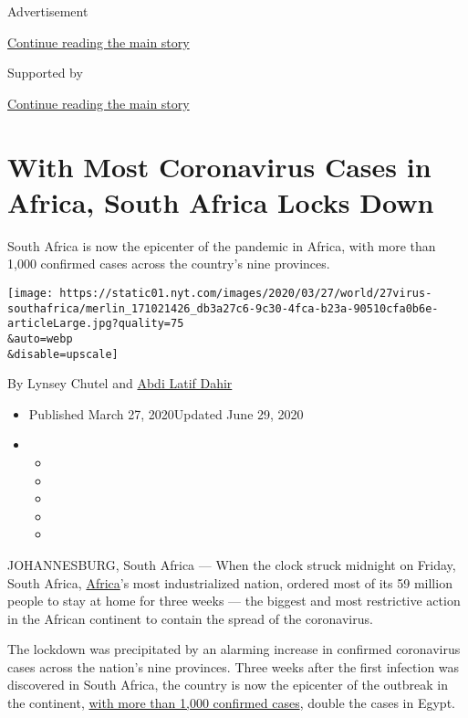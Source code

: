 Advertisement

\protect\hyperlink{after-top}{Continue reading the main story}

Supported by

\protect\hyperlink{after-sponsor}{Continue reading the main story}

\hypertarget{with-most-coronavirus-cases-in-africa-south-africa-locks-down}{%
\section{With Most Coronavirus Cases in Africa, South Africa Locks
Down}\label{with-most-coronavirus-cases-in-africa-south-africa-locks-down}}

South Africa is now the epicenter of the pandemic in Africa, with more
than 1,000 confirmed cases across the country's nine provinces.

\texttt{[image: https://static01.nyt.com/images/2020/03/27/world/27virus-southafrica/merlin\_171021426\_db3a27c6-9c30-4fca-b23a-90510cfa0b6e-articleLarge.jpg?quality=75\\\&auto=webp\\\&disable=upscale]}

By Lynsey Chutel and
\href{https://www.nytimes.com/by/abdi-latif-dahir}{Abdi Latif Dahir}

\begin{itemize}
\item
  Published March 27, 2020Updated June 29, 2020
\item
  \begin{itemize}
  \item
  \item
  \item
  \item
  \item
  \end{itemize}
\end{itemize}

JOHANNESBURG, South Africa --- When the clock struck midnight on Friday,
South Africa,
\href{https://www.nytimes.com/2020/06/29/world/africa/Africa-middle-class-coronavirus.html}{Africa}'s
most industrialized nation, ordered most of its 59 million people to
stay at home for three weeks --- the biggest and most restrictive action
in the African continent to contain the spread of the coronavirus.

The lockdown was precipitated by an alarming increase in confirmed
coronavirus cases across the nation's nine provinces. Three weeks after
the first infection was discovered in South Africa, the country is now
the epicenter of the outbreak in the continent,
\href{https://twitter.com/nicd_sa/status/1243438789692919808}{with more
than 1,000 confirmed cases}, double the cases in Egypt.

